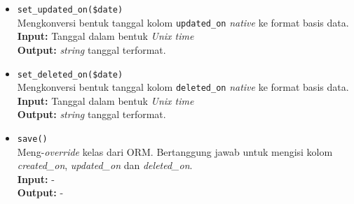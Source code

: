 \begin{itemize}
\begin{itemize}
                \item \texttt{set\_updated\_on(\$date)} \\
                    Mengkonversi bentuk tanggal kolom \texttt{updated\_on}
                    \textit{native} ke format basis data. \\
                    \textbf{Input:} Tanggal dalam bentuk \textit{Unix time}\\
                    \textbf{Output:} \textit{string} tanggal terformat.
                    
                \item \texttt{set\_deleted\_on(\$date)} \\
                    Mengkonversi bentuk tanggal kolom \texttt{deleted\_on}
                    \textit{native} ke format basis data. \\
                    \textbf{Input:} Tanggal dalam bentuk \textit{Unix time}\\
                    \textbf{Output:} \textit{string} tanggal terformat.
                    
                \item \texttt{save()}\\
                    Meng-\textit{override} kelas dari ORM. Bertanggung jawab
                    untuk mengisi kolom \textit{created\_on},
                    \textit{updated\_on} dan \textit{deleted\_on}.\\
                    \textbf{Input:} -\\
                    \textbf{Output:} -
            \end{itemize}
            

\end{itemize}
